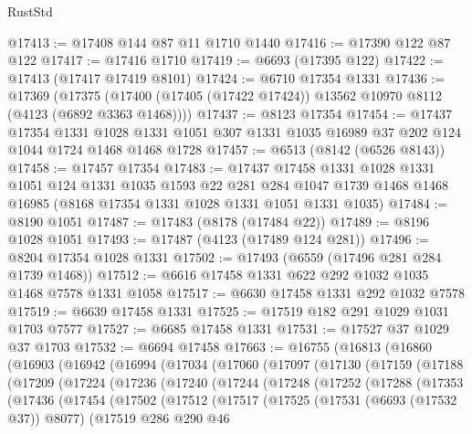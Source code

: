 \begin{lexlean}{RustStd}
\begin{coremodule}
@17413 := @17408 @144 @87 @11 @1710 @1440
@17416 := @17390 @122 @87 @122
@17417 := @17416 @1710
@17419 := @6693 (@17395 @122)
@17422 := @17413 (@17417 @17419 @8101)
@17424 := @6710 @17354 @1331
@17436 := @17369
    (@17375 (@17400 (@17405 (@17422 @17424)) @13562 @10970 @8112 (@4123 (@6892 @3363 @1468))))
@17437 := @8123 @17354
@17454 := @17437
    @17354
    @1331
    @1028
    @1331
    @1051
    @307
    @1331
    @1035
    @16989
    @37
    @202
    @124
    @1044
    @1724
    @1468
    @1468
    @1728
@17457 := @6513 (@8142 (@6526 @8143))
@17458 := @17457 @17354
@17483 := @17437
    @17458
    @1331
    @1028
    @1331
    @1051
    @124
    @1331
    @1035
    @1593
    @22
    @281
    @284
    @1047
    @1739
    @1468
    @1468
    @16985
    (@8168 @17354 @1331 @1028 @1331 @1051 @1331 @1035)
@17484 := @8190 @1051
@17487 := @17483 (@8178 (@17484 @22))
@17489 := @8196 @1028 @1051
@17493 := @17487 (@4123 (@17489 @124 @281))
@17496 := @8204 @17354 @1028 @1331
@17502 := @17493 (@6559 (@17496 @281 @284 @1739 @1468))
@17512 := @6616 @17458 @1331 @622 @292 @1032 @1035 @1468 @7578 @1331 @1058
@17517 := @6630 @17458 @1331 @292 @1032 @7578
@17519 := @6639 @17458 @1331
@17525 := @17519 @182 @291 @1029 @1031 @1703 @7577
@17527 := @6685 @17458 @1331
@17531 := @17527 @37 @1029 @37 @1703
@17532 := @6694 @17458
@17663 := @16755
    (@16813
      (@16860
        (@16903
          (@16942
            (@16994
              (@17034
                (@17060
                  (@17097
                    (@17130
                      (@17159
                        (@17188
                          (@17209
                            (@17224
                              (@17236
                                (@17240
                                  (@17244
                                    (@17248
                                      (@17252
                                        (@17288
                                          (@17353
                                            (@17436
                                              (@17454
                                                (@17502
                                                  (@17512
                                                    (@17517
                                                      (@17525
                                                        (@17531 (@6693 (@17532 @37)) @8077)
                                                        (@17519
                                                          @286
                                                          @290
                                                          @46

\end{coremodule}
\end{lexlean}
